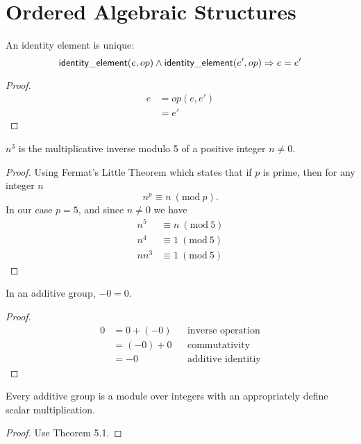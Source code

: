 \chapter{Ordered Algebraic Structures}

\begin{lemma}
	An identity element is unique:
	\[ \mathsf{identity\_element}(e, op) \wedge \mathsf{identity\_element}(e', op) \Rightarrow e = e' \]
\end{lemma}

\begin{proof}
	\begin{align*}
		e &= op(e, e')\\
		  &= e'
	\end{align*}
\end{proof}

\begin{lemma}
	$n^3$ is the multiplicative inverse modulo 5 of a positive integer $n \neq 0$.
\end{lemma}

\begin{proof}
	Using Fermat's Little Theorem which states that if $p$ is prime, then for any integer $n$
	\[ n^p \equiv n\ (\textrm{mod}\ p). \]
	In our case $p = 5$, and since $n \neq 0$ we have
	\begin{align*}
		n^5 &\equiv n\ (\textrm{mod}\ 5)\\
		n^4 &\equiv 1\ (\textrm{mod}\ 5)\\
		nn^3 &\equiv 1\ (\textrm{mod}\ 5)
	\end{align*}
\end{proof}

\begin{lemma}
	In an additive group, $-0 = 0$.
\end{lemma}

\begin{proof}
	\begin{align*}
		0 &= 0 + (-0) && \text{inverse operation}\\
		  &= (-0) + 0 && \text{commutativity}\\
		  &= -0       && \text{additive identitiy}
	\end{align*}
\end{proof}

\begin{lemma}
	Every additive group is a module over integers with an appropriately
	define scalar multiplication.
\end{lemma}

\begin{proof}
	Use Theorem 5.1.
\end{proof}

